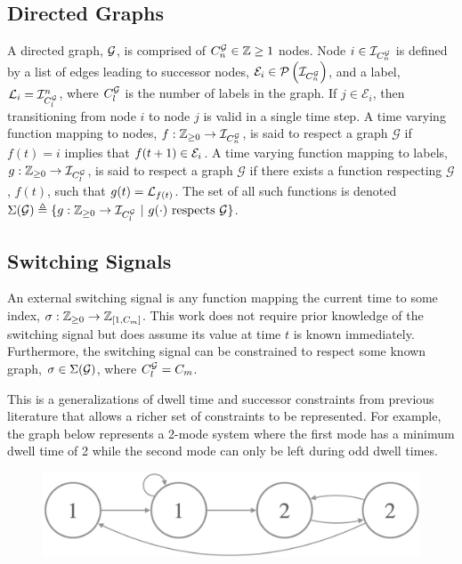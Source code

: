 \subsection{Directed Graphs}
A directed graph, $\mathcal{G}$, is comprised of $\gnumnodes\in\int\geq{1}$ nodes. Node $i\in\idxset{\gnumnodes}$ is defined by a list of edges leading to successor nodes, $\gnodeedges{i}\in\PowerSet{\idxset{\gnumnodes}}$, and a label, $\mathcal{L}_{i}=\mathcal{I}_{C_l^{\mathcal{G}}}^n$, where $C_l^{\mathcal{G}}$ is the number of labels in the graph. If $j\in\mathcal{E}_i$, then transitioning from node $i$ to node $j$ is valid in a single time step. A time varying function mapping to nodes, $f:\int\rgeq{0}\rightarrow\idxset{\gnumnodes}$, is said to respect a graph $\mathcal{G}$ if $f(t)=i$ implies that $f(t+1)\in\gnodeedges{i}$. A time varying function mapping to labels, $g:\mathbb{Z}_{\geq 0}\rightarrow\mathcal{I}_{C_l^{\mathcal{G}}}$, is said to respect a graph $\mathcal{G}$ if  there exists a function respecting $\mathcal{G}$, $f(t)$, such that $g(t)=\mathcal{L}_{f(t)}$. The set of all such functions is denoted $\Sigma(\mathcal{G})\triangleq\{g:\int\rgeq{0}\rightarrow\idxset{\gnumlabels}\ |\ g(\cdot)\text{ respects }\graph\}$. 

\subsection{Switching Signals}
An external switching signal is any function mapping the current time to some index, $\ss:\int\rgeq{0}\rightarrow\int\rii{1}{\nummodes}$. This work does not require prior knowledge of the switching signal but does assume its value at time $t$ is known immediately. Furthermore, the switching signal can be constrained to respect some known graph, ${\sigma}\in\Sigma(\mathcal{G})$, where $\gnumlabels=\nummodes$. 
\begin{remark}
This is a generalizations of dwell time and successor constraints from previous literature that allows a richer set of constraints to be represented. For example, the graph below represents a 2-mode system where the first mode has a minimum dwell time of 2 while the second mode can only be left during odd dwell times.
\begin{figure}[h!]
\centering
\includegraphics[scale=0.15]{./figures/graph_remark}
\end{figure}
\end{remark}

